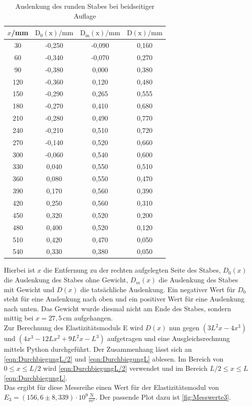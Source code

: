   \begin{table}
    \centering
    \caption{Auslenkung des runden Stabes bei beidseitiger Auflage}
    \label{tab:beidseitig_runder_Nullauslenkung}
    \begin{tabular}{c c c c}
      \toprule
      $x$/mm & $\mathrm{D_0(x)}/\mathrm{mm}$ & $\mathrm{D_m(x)}/\mathrm{mm}$ & $\mathrm{D(x)}/\mathrm{mm}$ \\
      \midrule
      30 & -0,250 & -0,090 & 0,160 \\
      60 & -0,340 & -0,070 & 0,270 \\
      90 & -0,380 & 0,000 & 0,380 \\
      120 & -0,360 & 0,120 & 0,480\\
      150 & -0,290 & 0,265 & 0,555 \\
      180 & -0,270 & 0,410 & 0,680 \\
      210 & -0,280 & 0,490 & 0,770 \\
      240 & -0,210 & 0,510 & 0,720 \\
      270 & -0,140 & 0,520 & 0,660 \\
      300 & -0,060 & 0,540 & 0,600\\
      330 & 0,040 & 0,550 & 0,510\\
      360 & 0,080 & 0,550 & 0,470\\
      390 & 0,170 & 0,560 & 0,390\\
      420 & 0,250 & 0,560 & 0,310 \\
      450 & 0,320 & 0,520 & 0,200\\
      480 & 0,400 & 0,520 & 0,120\\
      510 & 0,420 & 0,470 & 0,050\\
      540 & 0,330 & 0,380 & 0,050\\
      \bottomrule
    \end{tabular}
  \end{table}

  Hierbei ist $x$ die Entfernung zu der rechten aufgelegten Seite des Stabes, $D_0(x)$ die Auslenkung des Stabes ohne Gewicht, $D_m(x)$ die Auslenkung des Stabes mit Gewicht und
  $D(x)$ die tatsächliche Auslenkung. Ein negativer Wert für $D_0$ steht für eine Auslenkung nach oben und ein positiver Wert für eine Auslenkung nach unten. Das Gewicht wurde diesmal
  nicht am Ende des Stabes, sondern mittig bei $x=27,5 \, \mathrm{cm}$ aufgehangen.\\

  Zur Berechnung des Elastizitätsmoduls E wird $D(x)$ nun gegen $\left(3L^2x -4x^3\right)$ und $\left(4x^3 -12Lx^2 +9L^2 x - L^3\right)$ aufgetragen und eine Ausgleichsrechnung mittels Python durchgeführt. 
  Der Zusammenhang lässt sich an \autoref{eqn:DurchbiegungL/2} und \autoref{eqn:DurchbiegungL} ablesen. Im Bereich von $0 \leq x \leq L/2$ wird \autoref{eqn:DurchbiegungL/2} verwendet und im Bereich $L/2 \leq x \leq L$ 
  \autoref{eqn:DurchbiegungL}.\\
  Das ergibt für diese Messreihe einen Wert für der Elastizitätsmodul von $E_3 = (156{,}6 \pm 8{,}339) \cdot \mathrm{10^{9}} \frac{\mathrm{N}}{m^2}$. Der passende Plot dazu ist
  \autoref{fig:Messwerte3}.

